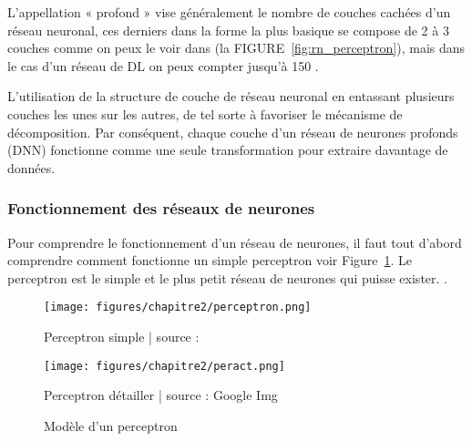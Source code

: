         \par L'appellation « profond » vise généralement le nombre de couches cachées d'un réseau neuronal, ces derniers dans la forme la plus basique se compose de 2 à 3 couches comme on peux le voir dans (la FIGURE~\ref{fig:rn_perceptron}), mais dans le cas d'un réseau de DL on peux compter jusqu'à 150 \cite{ch2ref5}.
        
        \par L'utilisation de la structure de couche de réseau neuronal en entassant plusieurs couches les unes sur les autres, de tel sorte à favoriser le mécanisme de décomposition. Par conséquent, chaque couche d'un réseau de neurones profonds (DNN) fonctionne comme une seule transformation pour extraire davantage de données. 

        
            \subsubsection{Fonctionnement des réseaux de neurones }
            
            \par Pour comprendre le fonctionnement d'un réseau de neurones, il faut tout d'abord comprendre comment fonctionne un simple perceptron voir Figure~\ref{fig:perceptron_gn}. Le perceptron est le simple et le plus petit réseau de neurones qui puisse exister. \cite{ch2ref12,ch2ref5,ch2ref4}.
            
            
            
            \begin{figure}[H]
                 \centering
                 \begin{minipage}[t]{.7\textwidth}
                     \centering
                     \texttt{[image: figures/chapitre2/perceptron.png]}
                     \caption{Perceptron simple | source : \cite{ch2ref12}}
                     \label{fig:perceptron_s}
                 \end{minipage}
                 \hfill
                 \begin{minipage}[t]{.7\textwidth}
                     \centering
                     \texttt{[image: figures/chapitre2/peract.png]}
                     \caption{Perceptron détailler | source : Google Img}
                     \label{fig:perceptron_d}
                 \end{minipage}
                 \hfill
                    \caption {Modèle d'un perceptron}
                    \label{fig:perceptron_gn}
            \end{figure}
        
